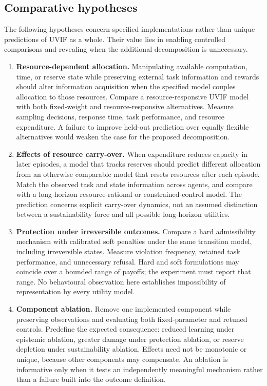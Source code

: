 \subsection{Comparative hypotheses}
\label{subsec:cog_predictions}
The following hypotheses concern specified implementations rather than unique predictions of UVIF as a whole. Their value lies in enabling controlled comparisons and revealing when the additional decomposition is unnecessary.

\begin{enumerate}[label=(H\arabic*),leftmargin=2.4em]
\item \textbf{Resource-dependent allocation.} Manipulating available computation, time, or reserve state while preserving external task information and rewards should alter information acquisition when the specified model couples allocation to those resources. Compare a resource-responsive UVIF model with both fixed-weight and resource-responsive alternatives. Measure sampling decisions, response time, task performance, and resource expenditure. A failure to improve held-out prediction over equally flexible alternatives would weaken the case for the proposed decomposition.

\item \textbf{Effects of resource carry-over.} When expenditure reduces capacity in later episodes, a model that tracks reserves should predict different allocation from an otherwise comparable model that resets resources after each episode. Match the observed task and state information across agents, and compare with a long-horizon resource-rational or constrained-control model. The prediction concerns explicit carry-over dynamics, not an assumed distinction between a sustainability force and all possible long-horizon utilities.

\item \textbf{Protection under irreversible outcomes.} Compare a hard admissibility mechanism with calibrated soft penalties under the same transition model, including irreversible states. Measure violation frequency, retained task performance, and unnecessary refusal. Hard and soft formulations may coincide over a bounded range of payoffs; the experiment must report that range. No behavioural observation here establishes impossibility of representation by every utility model.

\item \textbf{Component ablation.} Remove one implemented component while preserving observations and evaluating both fixed-parameter and retuned controls. Predefine the expected consequence: reduced learning under epistemic ablation, greater damage under protection ablation, or reserve depletion under sustainability ablation. Effects need not be monotonic or unique, because other components may compensate. An ablation is informative only when it tests an independently meaningful mechanism rather than a failure built into the outcome definition.
\end{enumerate}

